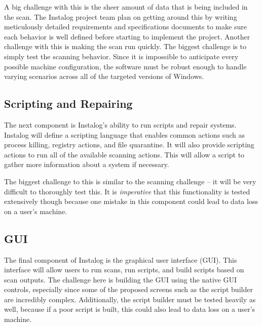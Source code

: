 \documentclass[letterpaper,12pt]{article}
\begin{document}
A big challenge with this is the sheer amount of data that is being included in
the scan.  The Instalog project team plan on getting around this by writing
meticulously detailed requirements and specifications documents to make sure
each behavior is well defined before starting to implement the project.
Another challenge with this is making the scan run quickly.  The biggest
challenge is to simply test the scanning behavior.  Since it is impossible to
anticipate every possible machine configuration, the software must be robust
enough to handle varying scenarios across all of the targeted versions of
Windows.

\subsection{Scripting and Repairing}
The next component is Instalog's ability to run scripts and repair systems. 
Instalog will define a scripting language that enables common actions such as
process killing, registry actions, and file quarantine.  It will also provide
scripting actions to run all of the available scanning actions.  This will allow
a script to gather more information about a system if necessary.  

The biggest challenge to this is similar to the scanning challenge -- it will be
very difficult to thoroughly test this.  It is \textit{imperative} that this
functionality is tested extensively though because one mistake in this component
could lead to data loss on a user's machine.  

\subsection{GUI}
The final component of Instalog is the graphical user interface (GUI).  This
interface will allow users to run scans, run scripts, and build scripts based on
scan outputs.  The challenge here is building the GUI using the native GUI
controls, especially since some of the proposed screens such as the script
builder are incredibly complex.  Additionally, the script builder must be tested
heavily as well, because if a poor script is built, this could also lead to data
loss on a user's machine.  

\newpage
\end{document}
